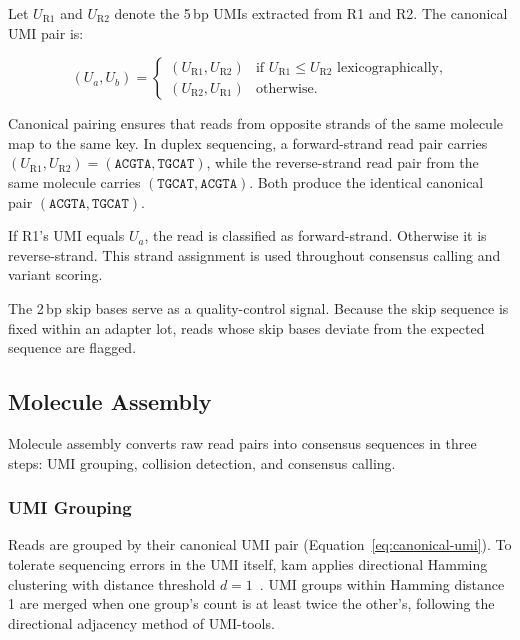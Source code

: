 Let $U_\text{R1}$ and $U_\text{R2}$ denote the 5\,bp UMIs extracted from R1 and R2.
The canonical UMI pair is:

\begin{equation}
  \label{eq:canonical-umi}
  (U_a, U_b) = \begin{cases}
    (U_\text{R1}, U_\text{R2}) & \text{if } U_\text{R1} \le U_\text{R2} \text{ lexicographically,} \\
    (U_\text{R2}, U_\text{R1}) & \text{otherwise.}
  \end{cases}
\end{equation}

Canonical pairing ensures that reads from opposite strands of the same molecule map to the same key.
In duplex sequencing, a forward-strand read pair carries $(U_\text{R1}, U_\text{R2}) = (\texttt{ACGTA}, \texttt{TGCAT})$, while the reverse-strand read pair from the same molecule carries $(\texttt{TGCAT}, \texttt{ACGTA})$.
Both produce the identical canonical pair $(\texttt{ACGTA}, \texttt{TGCAT})$.

If R1's UMI equals $U_a$, the read is classified as forward-strand. Otherwise it is reverse-strand. This strand assignment is used throughout consensus calling and variant scoring.

The 2\,bp skip bases serve as a quality-control signal.
Because the skip sequence is fixed within an adapter lot, reads whose skip bases deviate from the expected sequence are flagged.

\subsection{Molecule Assembly}
\label{sec:method:assembly}

Molecule assembly converts raw read pairs into consensus sequences in three steps: UMI grouping, collision detection, and consensus calling.

\subsubsection{UMI Grouping}

Reads are grouped by their canonical UMI pair (Equation~\ref{eq:canonical-umi}).
To tolerate sequencing errors in the UMI itself, kam applies directional Hamming clustering with distance threshold $d = 1$~\autocite{Smith17umitools}.
UMI groups within Hamming distance 1 are merged when one group's count is at least twice the other's, following the directional adjacency method of UMI-tools.

